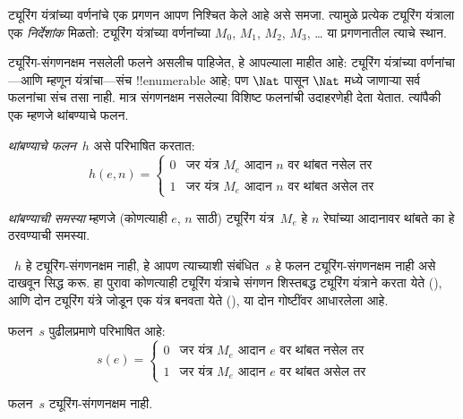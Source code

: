 \documentclass[../../../include/open-logic-section]{subfiles}
\begin{document}

\begin{explain}
ट्यूरिंग यंत्रांच्या वर्णनांचे एक प्रगणन आपण निश्चित
केले आहे असे समजा. त्यामुळे प्रत्येक ट्यूरिंग
यंत्राला एक \emph{निर्देशांक} मिळतो: ट्यूरिंग
यंत्रांच्या वर्णनांच्या $M_0$, $M_1$, $M_2$, $M_3$,
\dots{} या प्रगणनातील त्याचे स्थान.
%

ट्यूरिंग-संगणनक्षम नसलेली फलने असलीच पाहिजेत,
हे आपल्याला माहीत आहे: ट्यूरिंग यंत्रांच्या
वर्णनांचा---आणि म्हणून यंत्रांचा---संच
!!{enumerable} आहे; पण
$\Nat$ पासून $\Nat$ मध्ये जाणाऱ्या सर्व
फलनांचा संच तसा नाही. मात्र संगणनक्षम
नसलेल्या विशिष्ट फलनांची उदाहरणेही देता
येतात. त्यांपैकी एक म्हणजे थांबण्याचे फलन.
\end{explain}

\begin{defn}[थांबण्याचे फलन]
 \emph{थांबण्याचे फलन}~$h$ असे परिभाषित करतात:
\[
h(e,n) =
\begin{cases}
  \text{0} & \text{जर यंत्र~$M_e$ आदान $n$ वर थांबत नसेल तर} \\
  \text{1} & \text{जर यंत्र~$M_e$ आदान $n$ वर थांबत असेल तर}
\end{cases}
\]
\end{defn}

\begin{defn}[थांबण्याची समस्या]
\emph{थांबण्याची समस्या} म्हणजे (कोणत्याही $e$, $n$
साठी) ट्यूरिंग यंत्र~$M_e$ हे $n$ रेघांच्या
आदानावर थांबते का हे ठरवण्याची समस्या.
\end{defn}

\begin{explain}
~$h$ हे ट्यूरिंग-संगणनक्षम नाही, हे आपण
त्याच्याशी संबंधित~$s$ हे फलन ट्यूरिंग-संगणनक्षम
नाही असे दाखवून सिद्ध करू. हा पुरावा कोणत्याही
ट्यूरिंग यंत्राचे संगणन शिस्तबद्ध ट्यूरिंग
यंत्राने करता येते (),
आणि दोन ट्यूरिंग यंत्रे जोडून एक यंत्र
बनवता येते (),
या दोन गोष्टींवर आधारलेला आहे.
\end{explain}

\begin{defn} फलन~$s$ पुढीलप्रमाणे परिभाषित आहे:
\[
s(e) =
\begin{cases}
  \text{0} & \text{जर यंत्र~$M_e$ आदान $e$ वर थांबत नसेल तर} \\
  \text{1} & \text{जर यंत्र~$M_e$ आदान $e$ वर थांबत असेल तर}
\end{cases}
\]
\end{defn}

\begin{lem}
फलन~$s$ ट्यूरिंग-संगणनक्षम नाही.
\end{lem}
\end{document}
